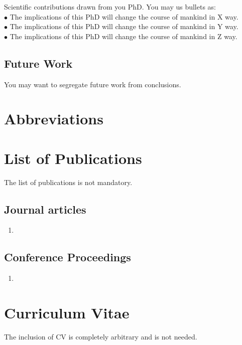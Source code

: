 \documentclass[12pt,a4paper]{article}
\begin{document}
Scientific contributions drawn from you PhD. You may us bullets as: \\

$\bullet$ \hspace{0.5cm}  The implications of this PhD will change the course of mankind in X way.\\

$\bullet$ \hspace{0.5cm}  The implications of this PhD will change the course of mankind in Y way.\\

$\bullet$ \hspace{0.5cm}  The implications of this PhD will change the course of mankind in Z way.\\


\newpage

\subsection{Future Work}

You may want to segregate future work from conclusions.



\newpage

\newpage
\listoffigures
{}
\newpage
\listoftables
{}
\newpage
\section*{Abbreviations}\label{abre}
\begin{acronym}
\end{acronym}
\newpage
\section*{List of Publications}\label{listof}
The list of publications is not mandatory.
\subsection*{Journal articles}
\begin{enumerate}
	\item {}
\end{enumerate}

\subsection*{Conference Proceedings}
\begin{enumerate}
	\item {}

\end{enumerate}


\newpage

\section*{Curriculum Vitae}
The inclusion of CV is completely arbitrary and is not needed.
\end{document}
